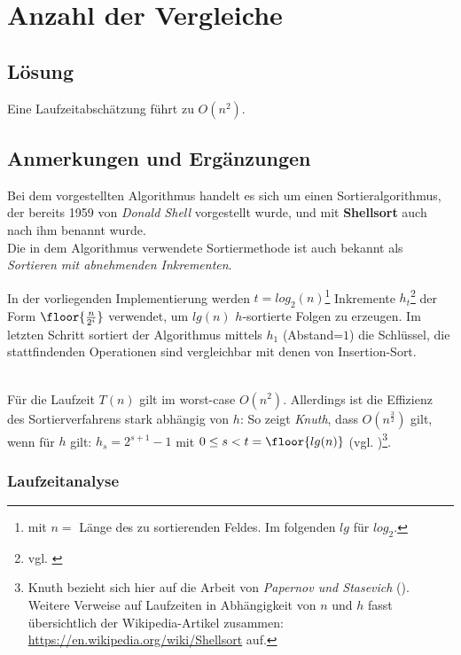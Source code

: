 \chapter{Anzahl der Vergleiche}

\section*{Lösung}

Eine Laufzeitabschätzung führt zu $O(n^2)$.


\section*{Anmerkungen und Ergänzungen}

Bei dem vorgestellten Algorithmus handelt es sich um einen Sortieralgorithmus, der bereits 1959 von \textit{Donald Shell} vorgestellt wurde, und mit \textbf{Shellsort} auch nach ihm benannt wurde.\\

Die in dem Algorithmus verwendete Sortiermethode ist auch bekannt als \textit{Sortieren mit abnehmenden Inkrementen}\cite[88]{OW17b}.

In der vorliegenden Implementierung werden $t = log_2(n)$\footnote{
    mit $n =$ Länge des zu sortierenden Feldes. Im folgenden $lg$ für $log_2$.
}  Inkremente $h_t$\footnote{
vgl. \cite[84]{Knu97b}
} der Form $\floor{\frac{n}{2^i}}$ verwendet, um $lg(n)$ $h$-sortierte Folgen zu erzeugen.
Im letzten Schritt sortiert der Algorithmus mittels $h_1$ (Abstand=$1$) die Schlüssel, die stattfindenden Operationen sind vergleichbar mit denen von Insertion-Sort.

\\
Für die Laufzeit $T(n)$ gilt im worst-case $O(n^2)$.
Allerdings ist die Effizienz des Sortierverfahrens stark abhängig von $h$: So zeigt \textit{Knuth}, dass $O(n^{\frac{3}{2}})$ gilt, wenn für $h$ gilt: $h_s = 2^{s+1} - 1$ mit $0 \leq s < t = \floor{lg(n)}$ (vgl. \cite[91]{Knu97b})\footnote{
Knuth bezieht sich hier auf die Arbeit von \textit{Papernov und Stasevich} (\cite[]{PS65}).
Weitere Verweise auf Laufzeiten in Abhängigkeit von $n$ und $h$ fasst übersichtlich der Wikipedia-Artikel zusammen: \url{https://en.wikipedia.org/wiki/Shellsort} auf.
}.

\subsection*{Laufzeitanalyse}

